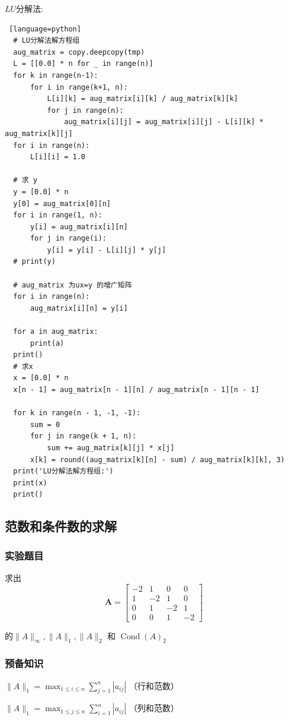 \documentclass[UTF8]{ctexart}
\begin{document}
$LU$分解法:
\begin{lstlisting} [language=python]
  # LU分解法解方程组
  aug_matrix = copy.deepcopy(tmp)
  L = [[0.0] * n for _ in range(n)]
  for k in range(n-1):
      for i in range(k+1, n):
          L[i][k] = aug_matrix[i][k] / aug_matrix[k][k]
          for j in range(n):
              aug_matrix[i][j] = aug_matrix[i][j] - L[i][k] * aug_matrix[k][j]
  for i in range(n):
      L[i][i] = 1.0
  
  # 求 y
  y = [0.0] * n
  y[0] = aug_matrix[0][n]
  for i in range(1, n):
      y[i] = aug_matrix[i][n]
      for j in range(i):
          y[i] = y[i] - L[i][j] * y[j]
  # print(y)
  
  # aug_matrix 为ux=y 的增广矩阵
  for i in range(n):
      aug_matrix[i][n] = y[i]
  
  for a in aug_matrix:
      print(a)
  print()
  # 求x
  x = [0.0] * n
  x[n - 1] = aug_matrix[n - 1][n] / aug_matrix[n - 1][n - 1]
  
  for k in range(n - 1, -1, -1):
      sum = 0
      for j in range(k + 1, n):
          sum += aug_matrix[k][j] * x[j]
      x[k] = round((aug_matrix[k][n] - sum) / aug_matrix[k][k], 3)
  print('LU分解法解方程组:')
  print(x)
  print()
\end{lstlisting}

\subsection{范数和条件数的求解}
\subsubsection{实验题目}
求出
$$
    \boldsymbol{A}=\left[\begin{array}{cccc}
        -2 & 1 & 0 & 0 \\
        1 & -2 & 1 & 0 \\
        0 & 1 & -2 & 1 \\
        0 & 0 & 1 & -2
        \end{array}\right]
$$

的$\|A\|_{\infty},\|A\|_{1},\|A\|_{2} \text { 和 } \operatorname{Cond}(A)_{2}$
\subsubsection{预备知识}
$\|A\|_{1}=\max _{1 \leq i \leq n} \sum_{j=1}^{n}\left|a_{i j}\right|$ （行和范数）

$\|A\|_{1}=\max _{1 \leq j \leq n} \sum_{i=1}^{n}\left|a_{i j}\right|$ （列和范数）
\end{document}

